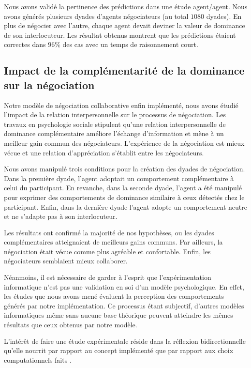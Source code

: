 		Nous avons validé la pertinence des prédictions dans une étude agent/agent. Nous avons générés plusieurs dyades d'agents négociateurs (au total $1080$ dyades). En plus de négocier avec l'autre, chaque agent devait deviner la valeur de dominance de son interlocuteur.
		Les résultat obtenus montrent que les prédictions étaient correctes dans $96\%$ des cas avec un temps de raisonnement court. 
		
		\subsection{Impact de la complémentarité de la dominance sur la négociation}
		
		Notre modèle de négociation collaborative enfin implémenté, nous avons étudié l'impact de la relation interpersonnelle sur le processus de négociation. 
		Les travaux en psychologie sociale stipulent qu’une relation interpersonnelle de dominance complémentaire améliore l’échange 
		d’information et mène à un meilleur gain commun des négociateurs.
		L’expérience de la négociation est mieux vécue et une relation d’appréciation s’établit entre les négociateurs. 
		
		Nous avons manipulé trois conditions pour la création des dyades de négociation. Dans la première dyade, l'agent adoptait un comportement complémentaire à celui du participant. En revanche, dans la seconde dyade, l'agent a été manipulé pour exprimer des comportements de dominance similaire à ceux détectés chez le participant. Enfin, dans la dernière dyade l'agent adopte un comportement neutre et ne s'adapte pas à son interlocuteur.
		
		Les résultats ont confirmé la majorité de nos hypothèses, ou les dyades complémentaires atteignaient de meilleurs gains communs. Par ailleurs,  la négociation était vécue comme plus agréable et confortable. Enfin, les négociateurs semblaient mieux collaborer. 
		
		Néanmoins, il est nécessaire de garder à l’esprit que l’expérimentation informatique n’est pas une validation en soi d’un modèle psychologique. En effet, les études que nous avons mené évaluent la perception des comportements générés par notre implémentation. Ce processus étant subjectif, d'autres modèles informatiques même sans aucune base théorique peuvent atteindre les mêmes résultats que ceux obtenus par notre modèle.
		
		L'intérêt de faire une étude expérimentale réside dans la réflexion bidirectionnelle qu’elle nourrit par rapport au concept implémenté que par rapport aux choix computationnels faits \cite{faur2016approche}.
		
